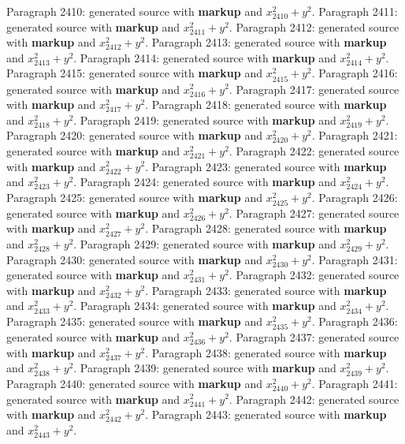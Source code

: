 \documentclass{article}
\begin{document}
Paragraph 2410: generated source with \textbf{markup} and $x_{2410}^2 + y^2$.
Paragraph 2411: generated source with \textbf{markup} and $x_{2411}^2 + y^2$.
Paragraph 2412: generated source with \textbf{markup} and $x_{2412}^2 + y^2$.
Paragraph 2413: generated source with \textbf{markup} and $x_{2413}^2 + y^2$.
Paragraph 2414: generated source with \textbf{markup} and $x_{2414}^2 + y^2$.
Paragraph 2415: generated source with \textbf{markup} and $x_{2415}^2 + y^2$.
Paragraph 2416: generated source with \textbf{markup} and $x_{2416}^2 + y^2$.
Paragraph 2417: generated source with \textbf{markup} and $x_{2417}^2 + y^2$.
Paragraph 2418: generated source with \textbf{markup} and $x_{2418}^2 + y^2$.
Paragraph 2419: generated source with \textbf{markup} and $x_{2419}^2 + y^2$.
Paragraph 2420: generated source with \textbf{markup} and $x_{2420}^2 + y^2$.
Paragraph 2421: generated source with \textbf{markup} and $x_{2421}^2 + y^2$.
Paragraph 2422: generated source with \textbf{markup} and $x_{2422}^2 + y^2$.
Paragraph 2423: generated source with \textbf{markup} and $x_{2423}^2 + y^2$.
Paragraph 2424: generated source with \textbf{markup} and $x_{2424}^2 + y^2$.
Paragraph 2425: generated source with \textbf{markup} and $x_{2425}^2 + y^2$.
Paragraph 2426: generated source with \textbf{markup} and $x_{2426}^2 + y^2$.
Paragraph 2427: generated source with \textbf{markup} and $x_{2427}^2 + y^2$.
Paragraph 2428: generated source with \textbf{markup} and $x_{2428}^2 + y^2$.
Paragraph 2429: generated source with \textbf{markup} and $x_{2429}^2 + y^2$.
Paragraph 2430: generated source with \textbf{markup} and $x_{2430}^2 + y^2$.
Paragraph 2431: generated source with \textbf{markup} and $x_{2431}^2 + y^2$.
Paragraph 2432: generated source with \textbf{markup} and $x_{2432}^2 + y^2$.
Paragraph 2433: generated source with \textbf{markup} and $x_{2433}^2 + y^2$.
Paragraph 2434: generated source with \textbf{markup} and $x_{2434}^2 + y^2$.
Paragraph 2435: generated source with \textbf{markup} and $x_{2435}^2 + y^2$.
Paragraph 2436: generated source with \textbf{markup} and $x_{2436}^2 + y^2$.
Paragraph 2437: generated source with \textbf{markup} and $x_{2437}^2 + y^2$.
Paragraph 2438: generated source with \textbf{markup} and $x_{2438}^2 + y^2$.
Paragraph 2439: generated source with \textbf{markup} and $x_{2439}^2 + y^2$.
Paragraph 2440: generated source with \textbf{markup} and $x_{2440}^2 + y^2$.
Paragraph 2441: generated source with \textbf{markup} and $x_{2441}^2 + y^2$.
Paragraph 2442: generated source with \textbf{markup} and $x_{2442}^2 + y^2$.
Paragraph 2443: generated source with \textbf{markup} and $x_{2443}^2 + y^2$.
\end{document}
